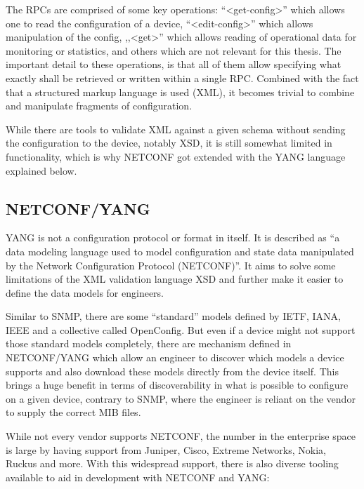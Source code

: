 The \acrshort{RPC}s are comprised of some key operations: ``<get-config>'' which allows one to read
the configuration of a device, ``<edit-config>'' which allows manipulation of the config, ,,<get>''
which allows reading of operational data for monitoring or statistics, and others which are not
relevant for this thesis. 
The important detail to these operations, is that all of them allow specifying what exactly shall
be retrieved or written within a single \acrshort{RPC}. Combined with the fact that a structured
markup language is used (XML), it becomes trivial to combine and manipulate fragments of configuration.

While there are tools to validate XML against a given schema without sending the configuration to the device,
notably \acrfull{XSD}, it is still somewhat limited in functionality, 
which is why NETCONF got extended with the YANG language explained below.

\subsection{\label{theory:conf:yang}NETCONF/YANG}

YANG is not a configuration protocol or format in itself.
It is described as ``a data modeling language used to model configuration and
state data manipulated by the Network Configuration Protocol (NETCONF)''.
It aims to solve some limitations of the XML validation language XSD and further make it
easier to define the data models for engineers.

Similar to SNMP, there are some ``standard'' models defined by \acrshort{IETF}, IANA, IEEE
and a collective called OpenConfig. But even if a device might not support those standard
models completely, there are mechanism defined in NETCONF/YANG which allow an engineer
to discover which models a device supports and also download these models directly from the
device itself. This brings a huge benefit in terms of discoverability in what is possible
to configure on a given device, contrary to SNMP, where the engineer is reliant on
the vendor to supply the correct MIB files.

While not every vendor supports NETCONF, the number in the enterprise space is large by
having support from Juniper, Cisco, Extreme Networks, Nokia, Ruckus and more.
With this widespread support, there is also diverse tooling available to aid in development
with NETCONF and YANG:

